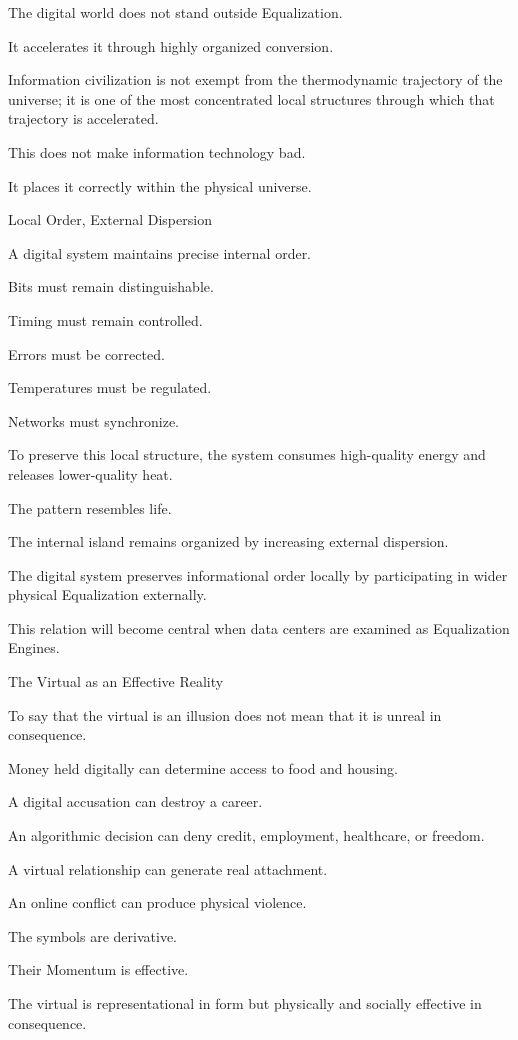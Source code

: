 The digital world does not stand outside Equalization.

It accelerates it through highly organized conversion.

Information civilization is not exempt from the thermodynamic trajectory of the universe; it is one of the most concentrated local structures through which that trajectory is accelerated.

This does not make information technology bad.

It places it correctly within the physical universe.

Local Order, External Dispersion

A digital system maintains precise internal order.

Bits must remain distinguishable.

Timing must remain controlled.

Errors must be corrected.

Temperatures must be regulated.

Networks must synchronize.

To preserve this local structure, the system consumes high-quality energy and releases lower-quality heat.

The pattern resembles life.

The internal island remains organized by increasing external dispersion.

The digital system preserves informational order locally by participating in wider physical Equalization externally.

This relation will become central when data centers are examined as Equalization Engines.

The Virtual as an Effective Reality

To say that the virtual is an illusion does not mean that it is unreal in consequence.

Money held digitally can determine access to food and housing.

A digital accusation can destroy a career.

An algorithmic decision can deny credit, employment, healthcare, or freedom.

A virtual relationship can generate real attachment.

An online conflict can produce physical violence.

The symbols are derivative.

Their Momentum is effective.

The virtual is representational in form but physically and socially effective in consequence.

